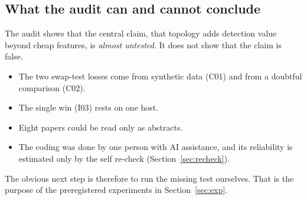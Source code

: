 \subsection{What the audit can and cannot conclude}
The audit shows that the central claim, that topology adds detection value beyond cheap features, is \emph{almost untested}. It does not show that the claim is false.
\begin{itemize}
  \item The two swap-test losses come from synthetic data (C01) and from a doubtful comparison (C02).
  \item The single win (I03) rests on one host.
  \item Eight papers could be read only as abstracts.
  \item The coding was done by one person with AI assistance, and its reliability is estimated only by the self re-check (Section~\ref{sec:recheck}).
\end{itemize}
The obvious next step is therefore to run the missing test ourselves. That is the purpose of the preregistered experiments in Section~\ref{sec:exp}.
